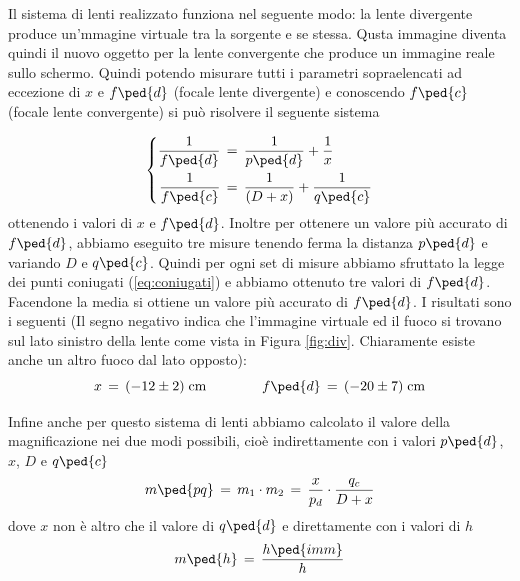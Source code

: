 Il sistema di lenti realizzato funziona nel seguente modo: la lente divergente produce un'mmagine virtuale tra la sorgente e se stessa. Qusta immagine diventa quindi il nuovo oggetto per la lente convergente che produce un immagine reale sullo schermo. Quindi potendo misurare tutti i parametri sopraelencati ad eccezione di $x$ e $f\ped{d}$ (focale lente divergente) e conoscendo $f\ped{c}$ (focale lente convergente) si può risolvere il seguente sistema

\begin{equation}
 \left\{
  \begin{aligned}
    \frac{1}{f\ped{d}} & \,=\, \frac{1}{p\ped{d}} + \frac{1}{x}\\
    \frac{1}{f\ped{c}} & \,=\, \frac{1}{(D + x)} + \frac{1}{q\ped{c}}
  \end{aligned}
\right.
\end{equation}
%
ottenendo i valori di $x$ e $f\ped{d}$. Inoltre per ottenere un valore più accurato di $f\ped{d}$, abbiamo eseguito tre misure tenendo ferma la distanza $p\ped{d}$ e variando $D$ e $q\ped{c}$. Quindi per ogni set di misure abbiamo sfruttato la legge dei punti coniugati (\ref{eq:coniugati}) e abbiamo ottenuto tre valori di $f\ped{d}$. Facendone la media si ottiene un valore più accurato di $f\ped{d}$. I risultati sono i seguenti (Il segno negativo indica che l'immagine virtuale ed il fuoco si trovano sul lato sinistro della lente come vista in Figura \ref{fig:div}. Chiaramente esiste anche un altro fuoco dal lato opposto):
\begin{equation}
	x \,=\, (-12 \pm 2) \;\si{\centi\metre} \qquad \qquad f\ped{d} \,=\, (-20 \pm 7) \;\si{\centi\metre}
\end{equation}

Infine anche per questo sistema di lenti abbiamo calcolato il valore della magnificazione nei due modi possibili, cioè indirettamente con i valori $p\ped{d}$, $x$, $D$ e $q\ped{c}$
\begin{equation}
    m\ped{pq} \,=\, m_1 \cdot m_2 \,=\, \frac{x}{p_d} \cdot \frac{q_c}{D+x}
\end{equation} %
dove $x$ non è altro che il valore di $q\ped{d}$ e direttamente con i valori di $h$
\begin{equation}
    m\ped{h} \,=\, \frac{h\ped{imm}}{h}
\end{equation}

